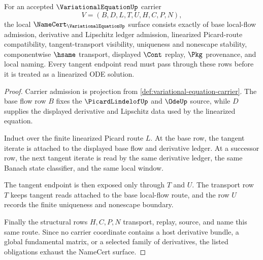 \begin{theorem}
\label{thm:variational-equation-namecert-obligations}
For an accepted $\VariationalEquationUp$ carrier
$$
V=(B,D,L,T,U,H,C,P,N),
$$
the local $\NameCert_{\VariationalEquationUp}$ surface consists exactly of base local-flow admission, derivative and Lipschitz ledger admission, linearized Picard-route compatibility, tangent-transport visibility, uniqueness and nonescape stability, componentwise $\hsame$ transport, displayed $\Cont$ replay, $\Pkg$ provenance, and local naming. Every tangent endpoint read must pass through these rows before it is treated as a linearized ODE solution.
\end{theorem}
\begin{proof}
Carrier admission is projection from \autoref{def:variational-equation-carrier}. The base flow row $B$ fixes the $\PicardLindelofUp$ and $\OdeUp$ source, while $D$ supplies the displayed derivative and Lipschitz data used by the linearized equation.

Induct over the finite linearized Picard route $L$. At the base row, the tangent iterate is attached to the displayed base flow and derivative ledger. At a successor row, the next tangent iterate is read by the same derivative ledger, the same Banach state classifier, and the same local window.

The tangent endpoint is then exposed only through $T$ and $U$. The transport row $T$ keeps tangent reads attached to the base local-flow route, and the row $U$ records the finite uniqueness and nonescape boundary.

Finally the structural rows $H,C,P,N$ transport, replay, source, and name this same route. Since no carrier coordinate contains a host derivative bundle, a global fundamental matrix, or a selected family of derivatives, the listed obligations exhaust the NameCert surface.
\end{proof}

